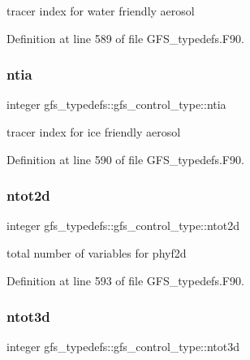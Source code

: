 tracer index for water friendly aerosol 



Definition at line 589 of file G\+F\+S\+\_\+typedefs.\+F90.

\mbox{\label{structgfs__typedefs_1_1gfs__control__type_a2bd27c7d34a02b0026dae5fd5ec0a207}} 
\subsubsection{ntia}
{\footnotesize\ttfamily integer gfs\+\_\+typedefs\+::gfs\+\_\+control\+\_\+type\+::ntia}



tracer index for ice friendly aerosol 



Definition at line 590 of file G\+F\+S\+\_\+typedefs.\+F90.

\mbox{\label{structgfs__typedefs_1_1gfs__control__type_ad6ae8c6692cdad0117a60590c0ae1f89}} 
\subsubsection{ntot2d}
{\footnotesize\ttfamily integer gfs\+\_\+typedefs\+::gfs\+\_\+control\+\_\+type\+::ntot2d}



total number of variables for phyf2d 



Definition at line 593 of file G\+F\+S\+\_\+typedefs.\+F90.

\mbox{\label{structgfs__typedefs_1_1gfs__control__type_a6f42a391d9fe67f872a70e886c384860}} 
\subsubsection{ntot3d}
{\footnotesize\ttfamily integer gfs\+\_\+typedefs\+::gfs\+\_\+control\+\_\+type\+::ntot3d}



